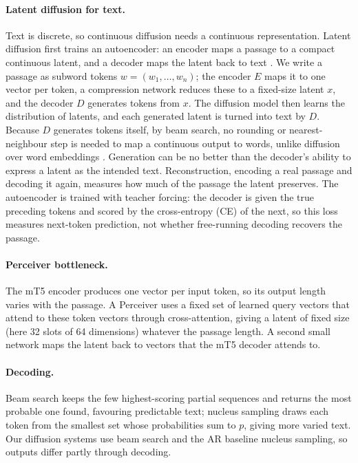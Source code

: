 \documentclass[11pt,a4paper]{article}
\begin{document}
\paragraph{Latent diffusion for text.} Text is discrete, so continuous diffusion needs a continuous representation. Latent diffusion first trains an autoencoder: an encoder maps a passage to a compact continuous latent, and a decoder maps the latent back to text \citep{rombach2022high,lovelace2023latent}. We write a passage as subword tokens $w=(w_1,\dots,w_n)$; the encoder $E$ maps it to one vector per token, a compression network reduces these to a fixed-size latent $x$, and the decoder $D$ generates tokens from $x$. The diffusion model then learns the distribution of latents, and each generated latent is turned into text by $D$. Because $D$ generates tokens itself, by beam search, no rounding or nearest-neighbour step is needed to map a continuous output to words, unlike diffusion over word embeddings \citep{li2022diffusionlm}. Generation can be no better than the decoder's ability to express a latent as the intended text. Reconstruction, encoding a real passage and decoding it again, measures how much of the passage the latent preserves. The autoencoder is trained with teacher forcing: the decoder is given the true preceding tokens and scored by the cross-entropy (CE) of the next, so this loss measures next-token prediction, not whether free-running decoding recovers the passage.

\paragraph{Perceiver bottleneck.} The mT5 encoder produces one vector per input token, so its output length varies with the passage. A Perceiver \citep{jaegle2021perceiver} uses a fixed set of learned query vectors that attend to these token vectors through cross-attention, giving a latent of fixed size (here 32 slots of 64 dimensions) whatever the passage length. A second small network maps the latent back to vectors that the mT5 decoder attends to.

\paragraph{Decoding.} Beam search keeps the few highest-scoring partial sequences and returns the most probable one found, favouring predictable text; nucleus sampling \citep{holtzman2020curious} draws each token from the smallest set whose probabilities sum to $p$, giving more varied text. Our diffusion systems use beam search and the AR baseline nucleus sampling, so outputs differ partly through decoding.
\end{document}

